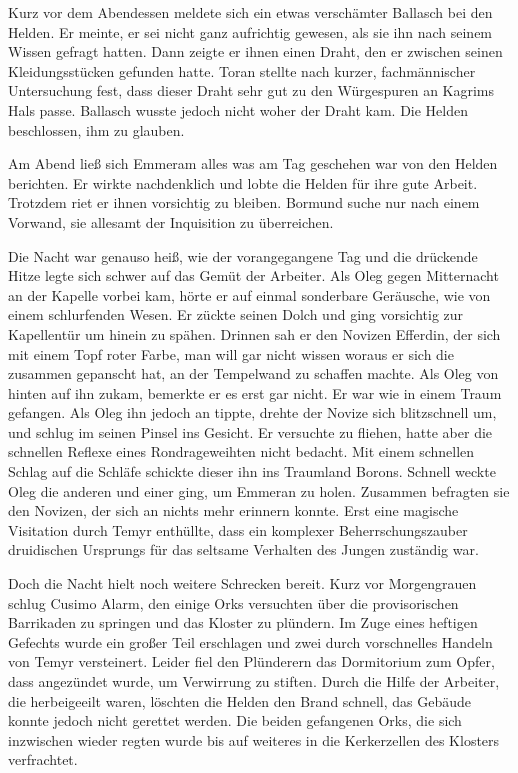 Kurz vor dem Abendessen meldete sich ein etwas verschämter Ballasch bei den Helden. Er meinte, er sei nicht ganz aufrichtig gewesen, als sie ihn nach seinem Wissen gefragt hatten. Dann zeigte er ihnen einen Draht, den er zwischen seinen Kleidungsstücken gefunden hatte. Toran stellte nach kurzer, fachmännischer Untersuchung fest, dass dieser Draht sehr gut zu den Würgespuren an Kagrims Hals passe. Ballasch wusste jedoch nicht woher der Draht kam. Die Helden beschlossen, ihm zu glauben.

Am Abend ließ sich Emmeram alles was am Tag geschehen war von den Helden berichten. Er wirkte nachdenklich und lobte die Helden für ihre gute Arbeit. Trotzdem riet er ihnen vorsichtig zu bleiben. Bormund suche nur nach einem Vorwand, sie allesamt der Inquisition zu überreichen.

Die Nacht war genauso heiß, wie der vorangegangene Tag und die drückende Hitze legte sich schwer auf das Gemüt der Arbeiter. Als Oleg gegen Mitternacht an der Kapelle vorbei kam, hörte er auf einmal sonderbare Geräusche, wie von einem schlurfenden Wesen. Er zückte seinen Dolch und ging vorsichtig zur Kapellentür um hinein zu spähen. Drinnen sah er den Novizen Efferdin, der sich mit einem Topf roter Farbe, man will gar nicht wissen woraus er sich die zusammen gepanscht hat, an der Tempelwand zu schaffen machte. Als Oleg von hinten auf ihn zukam, bemerkte er es erst gar nicht. Er war wie in einem Traum gefangen. Als Oleg ihn jedoch an tippte, drehte der Novize sich blitzschnell um, und schlug im seinen Pinsel ins Gesicht. Er versuchte zu fliehen, hatte aber die schnellen Reflexe eines Rondrageweihten nicht bedacht. Mit einem schnellen Schlag auf die Schläfe schickte dieser ihn ins Traumland Borons. Schnell weckte Oleg die anderen und einer ging, um Emmeran zu holen. Zusammen befragten sie den Novizen, der sich an nichts mehr erinnern konnte. Erst eine magische Visitation durch Temyr enthüllte, dass ein komplexer Beherrschungszauber druidischen Ursprungs für das seltsame Verhalten des Jungen zuständig war.

Doch die Nacht hielt noch weitere Schrecken bereit. Kurz vor Morgengrauen schlug Cusimo Alarm, den einige Orks versuchten über die provisorischen Barrikaden zu springen und das Kloster zu plündern. Im Zuge eines heftigen Gefechts wurde ein großer Teil erschlagen und zwei durch vorschnelles Handeln von Temyr versteinert. Leider fiel den Plünderern das Dormitorium zum Opfer, dass angezündet wurde, um Verwirrung zu stiften. Durch die Hilfe der Arbeiter, die herbeigeeilt waren, löschten die Helden den Brand schnell, das Gebäude konnte jedoch nicht gerettet werden. Die beiden gefangenen Orks, die sich inzwischen wieder regten wurde bis auf weiteres in die Kerkerzellen des Klosters verfrachtet. 

